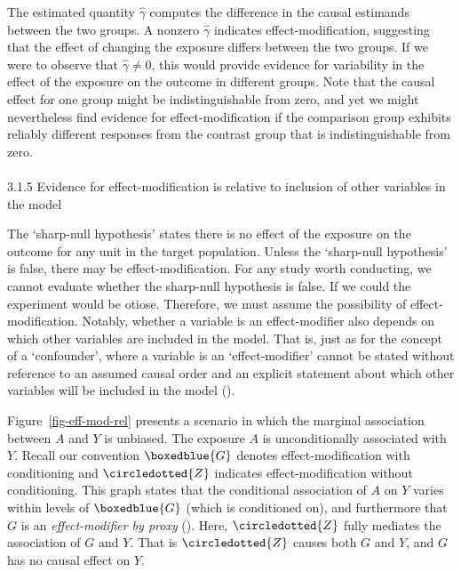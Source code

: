\documentclass[
  singlecolumn]{article}
\makeatletter
\let\oldparagraph\paragraph
\renewcommand{\paragraph}{
    \@ifstar
      \xxxParagraphStar
      \xxxParagraphNoStar
  }
\newcommand{\xxxParagraphStar}[1]{\oldparagraph*{#1}\mbox{}}
\newcommand{\xxxParagraphNoStar}[1]{\oldparagraph{#1}\mbox{}}
\makeatother
\begin{document}
The estimated quantity \(\hat{\gamma}\) computes the difference in the
causal estimands between the two groups. A nonzero \(\hat{\gamma}\)
indicates effect-modification, suggesting that the effect of changing
the exposure differs between the two groups. If we were to observe that
\(\hat{\gamma} \neq 0\), this would provide evidence for variability in
the effect of the exposure on the outcome in different groups. Note that
the causal effect for one group might be indistinguishable from zero,
and yet we might nevertheless find evidence for effect-modification if
the comparison group exhibits reliably different responses from the
contrast group that is indistinguishable from zero.

\paragraph{3.1.5 Evidence for effect-modification is relative to
inclusion of other variables in the
model}\label{evidence-for-effect-modification-is-relative-to-inclusion-of-other-variables-in-the-model}

The `sharp-null hypothesis' states there is no effect of the exposure on
the outcome for any unit in the target population. Unless the
`sharp-null hypothesis' is false, there may be effect-modification. For
any study worth conducting, we cannot evaluate whether the sharp-null
hypothesis is false. If we could the experiment would be otiose.
Therefore, we must assume the possibility of effect-modification.
Notably, whether a variable is an effect-modifier also depends on which
other variables are included in the model. That is, just as for the
concept of a `confounder', where a variable is an `effect-modifier'
cannot be stated without reference to an assumed causal order and an
explicit statement about which other variables will be included in the
model ().

Figure~\ref{fig-eff-mod-rel} presents a scenario in which the marginal
association between \(A\) and \(Y\) is unbiased. The exposure \(A\) is
unconditionally associated with \(Y\). Recall our convention
\(\boxedblue{G}\) denotes effect-modification with conditioning and
\(\circledotted{Z}\) indicates effect-modification without conditioning.
This graph states that the conditional association of \(A\) on \(Y\)
varies within levels of \(\boxedblue{G}\) (which is conditioned on), and
furthermore that \(G\) is an \emph{effect-modifier by proxy}
(). Here,
\(\circledotted{Z}\) fully mediates the association of \(G\) and \(Y\).
That is \(\circledotted{Z}\) causes both \(G\) and \(Y\), and \(G\) has
no causal effect on \(Y\).
\end{document}
